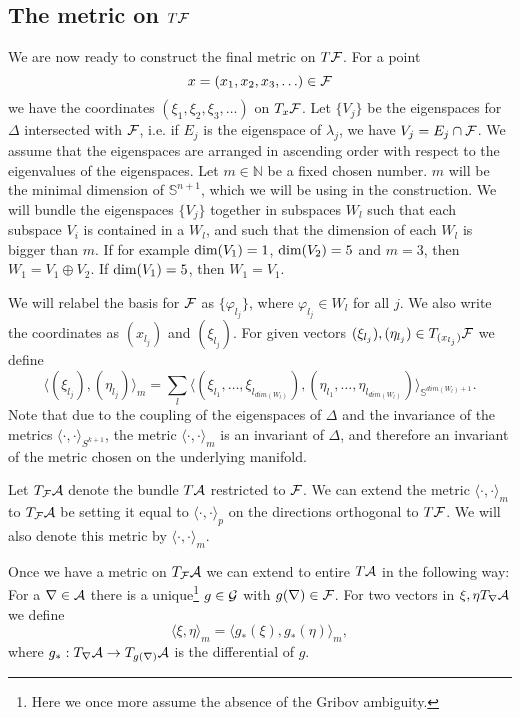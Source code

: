 \documentclass[letterpaper,11pt]{article}
\def\ca{{\cal A}}
\def\cf{{\cal F}}
\def\cg{{\cal G}}
\newcommand{\cF}{{\cal F}}
\begin{document}
\subsection{The metric on $T\cF$}

We are now ready to construct the final metric on $T\cF$. For a point $$x=(x_1,x_2,x_3,\ldots) \in \cf$$ 
we have the coordinates $(\xi_1,\xi_2,\xi_3,\ldots)$ on $T_x\cF$. Let $\{ V_j\}$ be the eigenspaces for $\Delta $ intersected with $\cF$, i.e. if $E_j$ is the eigenspace of $\lambda_j$, we have $V_j=E_j \cap \cF$. We assume that the eigenspaces are arranged in ascending order with respect to the eigenvalues of the eigenspaces. Let $m\in \mathbb{N}$ be a fixed chosen number. $m$ will be the minimal dimension of $\mathbb{S}^{n+1}$, which we will be using in the construction.   We will bundle the eigenspaces $\{ V_j\}$ together in subspaces $W_l$ such that each subspace $V_i$ is contained in a $W_l$, and such that the dimension of each $W_l$ is bigger than $m$. If for example $\hbox{dim} (V_1)=1$, $\hbox{dim} (V_2)=5$ and $m=3$, then $W_1=V_1\oplus V_2 $. If $\hbox{dim} (V_1)=5$, then $W_1=V_1 $. 

We will relabel the basis for $\cF$ as $\{ \varphi_{l_j}\}$, where $\varphi_{l_j}\in W_l$ for all $j$. We also write the coordinates as $(x_{l_j})$ and $(\xi_{l_j})$.
For given vectors $(\xi_{l_j}),(\eta_{l_j})\in T_{(x_{l_j})} \cF$ we define
$$  \langle (\xi_{l_j})    , (\eta_{l_j})  \rangle_m = \sum_{l} \langle (\xi_{l_1}, \ldots ,\xi_{l_{dim ( W_l)}}) , (\eta_{l_1}, \ldots ,\eta_{l_{dim ( W_l)}}) \rangle_{\mathbb{S}^{dim (W_l)+1}} .$$
%
Note that due to the coupling of the eigenspaces of $\Delta$ and the invariance of the metrics $\langle \cdot ,\cdot \rangle_{S^{k+1}}$, the metric $\langle \cdot ,\cdot \rangle_m$ is an invariant of $\Delta$, and therefore an invariant of the metric chosen on the underlying manifold.

Let $T_\cf\ca$ denote the bundle $T\ca$ restricted to $\cf$. We can extend the metric $\langle \cdot ,\cdot \rangle_m$ to  $T_\cf\ca$ be setting it equal to $\langle \cdot , \cdot \rangle_p$ on the directions orthogonal to $T\cf$. We will also denote this metric by $\langle \cdot ,\cdot \rangle_m$.

Once we have a metric on $T_\cf\ca$ we can extend to entire $T\ca$ in the following way: For a $\nabla \in \ca$ there is a unique\footnote{ Here we once more assume the absence of the Gribov ambiguity.} $g\in \cg$ with $g(\nabla )\in \cf$. For two vectors in $\xi,\eta T_\nabla \ca$ we define
\begin{equation}
\langle \xi , \eta  \rangle_m = \langle g_*(\xi) , g_*(\eta)  \rangle_m  ,
\label{Georgia}
\end{equation}
where $g_*:T_\nabla \ca \to T_{g(\nabla)}\ca$ is the differential of $g$. 
\end{document}
